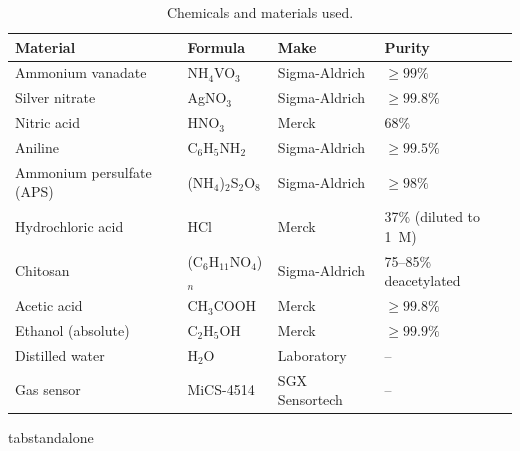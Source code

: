 \documentclass[11pt]{article}
\begin{document}
\setcounter{table}{0}
\fi\fi
\begin{table}[!htbp]
\centering
\caption{Chemicals and materials used.}
\label{tab:materials}
\scriptsize
\setlength{\tabcolsep}{3pt}
\begin{adjustbox}{max width=\textwidth,center}
\begin{tabular}{@{}L{4.6cm}L{3.8cm}L{3.4cm}L{4.2cm}@{}}
\toprule
\textbf{Material} & \textbf{Formula} & \textbf{Make} & \textbf{Purity} \\
\midrule
Ammonium vanadate & NH$_4$VO$_3$ & Sigma-Aldrich & $\geq 99\%$ \\
Silver nitrate & AgNO$_3$ & Sigma-Aldrich & $\geq 99.8\%$ \\
Nitric acid & HNO$_3$ & Merck & 68\% \\
Aniline & C$_6$H$_5$NH$_2$ & Sigma-Aldrich & $\geq 99.5\%$ \\
Ammonium persulfate (APS) & (NH$_4$)$_2$S$_2$O$_8$ & Sigma-Aldrich & $\geq 98\%$ \\
Hydrochloric acid & HCl & Merck & 37\% (diluted to 1~M) \\
Chitosan & (C$_6$H$_{11}$NO$_4$)$_n$ & Sigma-Aldrich & 75--85\% deacetylated \\
Acetic acid & CH$_3$COOH & Merck & $\geq 99.8\%$ \\
Ethanol (absolute) & C$_2$H$_5$OH & Merck & $\geq 99.9\%$ \\
Distilled water & H$_2$O & Laboratory & -- \\
Gas sensor & MiCS-4514 & SGX Sensortech & -- \\
\bottomrule
\end{tabular}
\end{adjustbox}
\end{table}
\expandafter\ifx\csname tabstandalone\endcsname\relax\else
\end{document}

